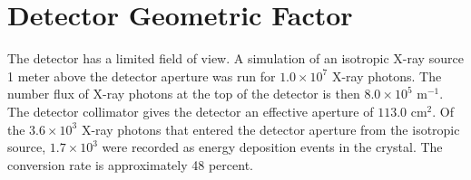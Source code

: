 \section{Detector Geometric Factor}

The detector has a limited field of view. A simulation of an isotropic X-ray source 1 meter above the detector aperture was run for $1.0\times10^7$ X-ray photons. The number flux of X-ray photons at the top of the detector is then $8.0\times10^5 \text{ m}^{-1}$. The detector collimator gives the detector an effective aperture of $113.0 \text{ cm}^2$. Of the $3.6\times10^3$ X-ray photons that entered the detector aperture from the isotropic source, $1.7\times10^3$ were recorded as energy deposition events in the crystal. The conversion rate is approximately 48 percent. 
